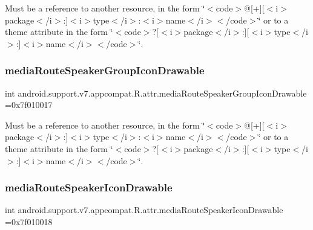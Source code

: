 Must be a reference to another resource, in the form \char`\"{}$<$code$>$@\mbox{[}+\mbox{]}\mbox{[}$<$i$>$package$<$/i$>$\+:\mbox{]}$<$i$>$type$<$/i$>$\+:$<$i$>$name$<$/i$>$$<$/code$>$\char`\"{} or to a theme attribute in the form \char`\"{}$<$code$>$?\mbox{[}$<$i$>$package$<$/i$>$\+:\mbox{]}\mbox{[}$<$i$>$type$<$/i$>$\+:\mbox{]}$<$i$>$name$<$/i$>$$<$/code$>$\char`\"{}. \mbox{\label{classandroid_1_1support_1_1v7_1_1appcompat_1_1R_1_1attr_a76d7150cd6f8ee9ee61ff719b36364cc}} 
\subsubsection{\texorpdfstring{media\+Route\+Speaker\+Group\+Icon\+Drawable}{mediaRouteSpeakerGroupIconDrawable}}
{\footnotesize\ttfamily int android.\+support.\+v7.\+appcompat.\+R.\+attr.\+media\+Route\+Speaker\+Group\+Icon\+Drawable =0x7f010017\hspace{0.3cm}{\ttfamily [static]}}

Must be a reference to another resource, in the form \char`\"{}$<$code$>$@\mbox{[}+\mbox{]}\mbox{[}$<$i$>$package$<$/i$>$\+:\mbox{]}$<$i$>$type$<$/i$>$\+:$<$i$>$name$<$/i$>$$<$/code$>$\char`\"{} or to a theme attribute in the form \char`\"{}$<$code$>$?\mbox{[}$<$i$>$package$<$/i$>$\+:\mbox{]}\mbox{[}$<$i$>$type$<$/i$>$\+:\mbox{]}$<$i$>$name$<$/i$>$$<$/code$>$\char`\"{}. \mbox{\label{classandroid_1_1support_1_1v7_1_1appcompat_1_1R_1_1attr_ab7f7a816aed59b138fe4663c5d097d38}} 
\subsubsection{\texorpdfstring{media\+Route\+Speaker\+Icon\+Drawable}{mediaRouteSpeakerIconDrawable}}
{\footnotesize\ttfamily int android.\+support.\+v7.\+appcompat.\+R.\+attr.\+media\+Route\+Speaker\+Icon\+Drawable =0x7f010018\hspace{0.3cm}{\ttfamily [static]}}

